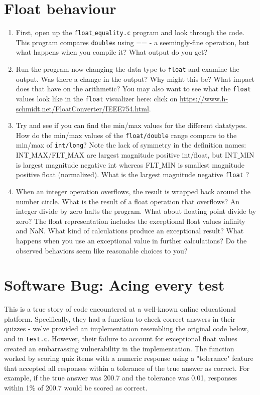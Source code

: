 \documentclass[11pt]{article}
\newcommand{\numtd}{03}
\newcommand{\titretd}{Floating Point Representation}
\begin{document}
	
	\entete{\numtd}{\titretd}

\section{Float behaviour}
\begin{enumerate}
	\item First, open up the \texttt{float$\_$equality.c} program and look through the code. This program compares \texttt{double}s using $\texttt{==}$ - a seemingly-fine operation, but what happens when you compile it? What output do you get? %
	\item Run the program now changing the data type to \texttt{float} and examine the output. Was there a change in the output? Why might this be? What impact does that have on the arithmetic? You may also want to see what the \texttt{float} values look like in the \texttt{float} visualizer here: click on \url{https://www.h-schmidt.net/FloatConverter/IEEE754.html}.
	\item Try and see if you can find the min/max values for the different datatypes. How do the min/max values of the \texttt{float/double} range compare to the min/max of \texttt{int/long}?
	Note the lack of symmetry in the definition names: INT$\_$MAX/FLT$\_$MAX are largest magnitude positive int/float, but INT$\_$MIN is largest magnitude negative int whereas FLT$\_$MIN is smallest magnitude positive float (normalized). What is the largest magnitude negative \texttt{float} ?
	\item When an integer operation overflows, the result is wrapped back around the number circle. What is the result of a float operation that overflows?
	An integer divide by zero halts the program. What about floating point divide by zero?
	The float representation includes the exceptional float values infinity and NaN. What kind of calculations produce an exceptional result? What happens when you use an exceptional value in further calculations?
	Do the observed behaviors seem like reasonable choices to you?
\end{enumerate}

\section{Software Bug: Acing every test}
This is a true story of code encountered at a well-known online educational platform. Specifically, they had a function to check correct answers in their quizzes - we've provided an implementation resembling the original code below, and in \texttt{test.c}. However, their failure to account for exceptional float values created an embarrassing vulnerability in the implementation. The function worked by scoring quiz items with a numeric response using a "tolerance" feature that accepted all responses within a tolerance of the true answer as correct. For example, if the true answer was 200.7 and the tolerance was 0.01, responses within 1$\%$ of 200.7 would be scored as correct.
\end{document}
